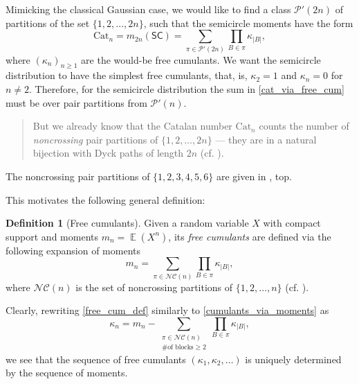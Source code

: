 \documentclass[letterpaper,11pt,oneside,reqno]{amsart}
\numberwithin{equation}{section}
\newcommand{\SC}{\mathsf{SC}}
\DeclareMathOperator{\EE}{\mathbb{E}}
\theoremstyle{definition}
\newtheorem{definition}[proposition]{Definition}
\begin{document}
Mimicking the classical Gaussian case, we would like to
find a class $\mathcal{P}'(2n)$ of partitions of the set $\{1,2,\ldots,2n\}$, such that the semicircle
moments have the form
\begin{equation}\label{cat_via_free_cum}
	\mathrm{Cat}_{n}=m_{2n}(\SC)=\sum_{\pi\in \mathcal{P}'(2n)}\prod_{B\in\pi} \kappa_{|B|},
\end{equation}
where $(\kappa_n)_{n\ge1}$ are the would-be free cumulants.
We want the semicircle distribution to have the simplest free cumulants, 
that, is, $\kappa_2=1$ and $\kappa_n=0$ for $n\ne2$.
Therefore, for the semicircle distribution
the sum in \eqref{cat_via_free_cum} must be over pair partitions from 
$\mathcal{P}'(n)$. 
\begin{quote}
	But we already know that the 
	Catalan number $\mathrm{Cat}_{n}$ counts the 
	number of \emph{noncrossing} pair partitions of $\{1,2,\ldots,2n\}$
	--- they are in a natural bijection with Dyck paths 
	of length $2n$ (cf. ).
\end{quote}
The noncrossing pair partitions of $\{1,2,3,4,5,6\}$ are given in
, top.

This motivates the following general definition:
\begin{definition}[Free cumulants]
	Given a random variable $X$ with compact support and moments
	$m_n=\EE(X^{n})$, its \emph{free cumulants} are defined via the following expansion of moments
	\begin{equation}\label{free_cum_def}
		m_n=\sum_{\pi\in \mathcal{NC}(n)}\prod_{B\in\pi} \kappa_{|B|},
	\end{equation}
	where $\mathcal{NC}(n)$ is the set of noncrossing partitions of $\{1,2,\ldots,n\}$
	(cf. ).
\end{definition}
Clearly, rewriting \eqref{free_cum_def} similarly to \eqref{cumulants_via_moments} as
\begin{equation}\label{free_cum_via_mom}
	\kappa_n=m_n-\sum_{\substack{\pi\in\mathcal{NC}(n)\\\text{\# of blocks}\geq 2}} \prod_{B\in \pi} \kappa_{|B|},
\end{equation}
we see that the sequence of free cumulants $(\kappa_1,\kappa_2,\ldots)$
is uniquely determined by the sequence of moments.
\end{document}
